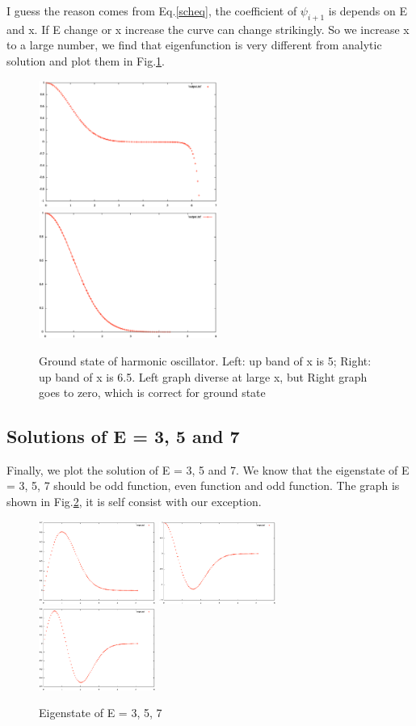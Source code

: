 \documentclass{article}
\begin{document}
I guess the reason comes from Eq.\ref{scheq}, the coefficient of $\psi_{i+1}$ is depends on E and x. If E change or x increase the curve can change strikingly. So we increase x to a large number, we find that eigenfunction is very different from analytic solution and plot them in Fig.\ref{xlarge}.
\begin{figure}
    \centering
    \includegraphics[width=2.3in]{largex.eps}
    \includegraphics[width=2.3in]{ground_num.eps}
    \caption{Ground state of harmonic oscillator. Left: up band of x is 5; Right:  up band of x is 6.5. Left graph diverse at large x, but Right graph goes to zero, which is correct for ground state}
    \label{xlarge}
\end{figure}

\subsection{Solutions of E = 3, 5 and 7}
Finally, we plot the solution of E = 3, 5 and 7. We know that the eigenstate of E = 3, 5, 7 should be odd function, even function and odd function. The graph is shown in Fig.\ref{eigens}, it is self consist with our exception.

\begin{figure}
    \centering
    \includegraphics[width=1.5in]{n=1.eps}
    \includegraphics[width=1.5in]{n=2.eps}
    \includegraphics[width=1.5in]{n=3.eps}
    \caption{Eigenstate of E = 3, 5, 7}
    \label{eigens}
\end{figure}
\end{document}
